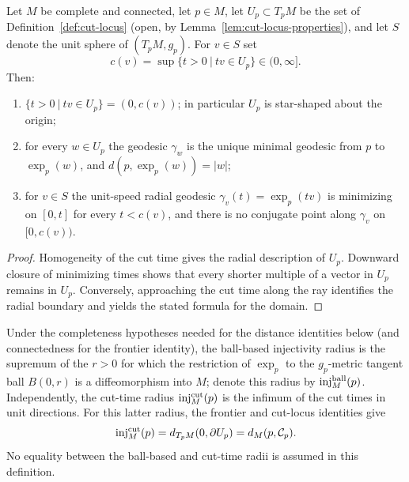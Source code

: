 \begin{lemma}
\label{lem:cut-time-star-shaped}



Let $M$ be complete and connected, let $p\in M$, let
$U_p\subset T_pM$ be the
set of Definition~\ref{def:cut-locus} (open, by
Lemma~\ref{lem:cut-locus-properties}), and let $S$ denote the
unit sphere of $(T_pM,g_p)$. For $v\in S$ set
$$c(v)=\sup\{t>0\ |\ tv\in U_p\}\in(0,\infty].$$
Then:
\begin{enumerate}
\item $\{t>0\ |\ tv\in U_p\}=(0,c(v))$; in particular $U_p$ is
star-shaped about the origin;
\item for every $w\in U_p$ the geodesic $\gamma_w$ is the unique
minimal geodesic from $p$ to $\exp_p(w)$, and
$d(p,\exp_p(w))=|w|$;
\item for $v\in S$ the unit-speed radial geodesic
$\gamma_v(t)=\exp_p(tv)$ is minimizing on $[0,t]$ for every
$t<c(v)$, and there is no conjugate point along $\gamma_v$ on
$[0,c(v))$.
\end{enumerate}
\end{lemma}

\begin{proof}
\sketch
{}
Homogeneity of the cut time gives the radial description of $U_p$. Downward closure of minimizing times shows that every shorter multiple of a vector in $U_p$ remains in $U_p$. Conversely, approaching the cut time along the ray identifies the radial boundary and yields the stated formula for the domain.
\end{proof}




\begin{definition}
\label{def:injectivity-radius}


Under the completeness hypotheses needed for the distance identities below
(and connectedness for the frontier identity), the ball-based injectivity
radius is the supremum of the $r>0$ for which
the restriction of $\exp_p$ to the $g_p$-metric tangent ball $B(0,r)$ is a
diffeomorphism into $M$; denote this radius by
$\operatorname{inj}^{\rm ball}_M(p)$. Independently, the cut-time radius
$\operatorname{inj}_M^{\rm cut}(p)$ is the infimum of the cut times in unit directions.
For this latter radius, the frontier and cut-locus identities give
\[
\operatorname{inj}_M^{\rm cut}(p)=d_{T_pM}(0,\partial U_p)
  =d_M(p,{\mathcal C}_p).
\]
No equality between the ball-based and cut-time radii is assumed in this
definition.
\end{definition}

